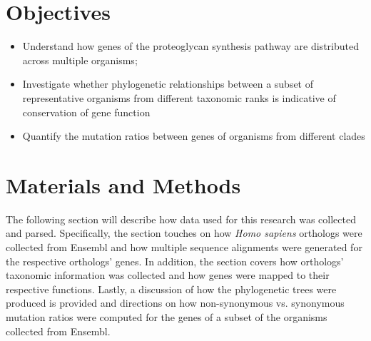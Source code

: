 \documentclass{article}
\begin{document}
\section*{Objectives}
\begin{itemize}
	\item Understand how genes of the proteoglycan synthesis pathway are distributed across multiple organisms;
	\item Investigate whether phylogenetic relationships between a subset of representative organisms from different taxonomic ranks is indicative of conservation of gene function
	\item Quantify the mutation ratios between genes of organisms from different clades
\end{itemize}

\section*{Materials and Methods}

The following section will describe how data used for this research was collected and parsed. Specifically, the section touches on how \textit{Homo sapiens} orthologs were collected from Ensembl and how multiple sequence alignments were generated for the respective orthologs' genes. In addition, the section covers how orthologs' taxonomic information was collected and how genes were mapped to their respective functions. Lastly, a discussion of how the phylogenetic trees were produced is provided and directions on how non-synonymous vs. synonymous mutation ratios were computed for the genes of a subset of the organisms collected from Ensembl.
\end{document}
